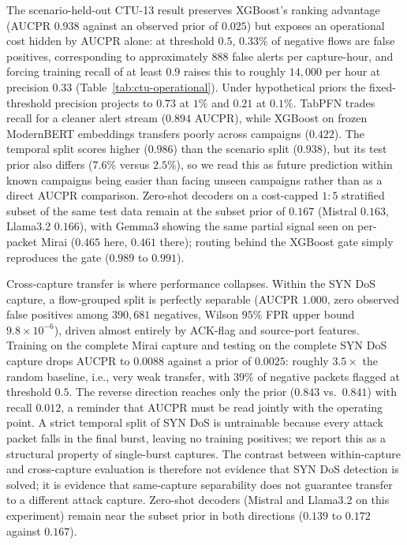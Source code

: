 \documentclass{jmlr}
\begin{document}


\noindent The scenario-held-out CTU-13 result preserves XGBoost's ranking advantage (AUCPR $0.938$ against an observed prior of $0.025$) but exposes an operational cost hidden by AUCPR alone: at threshold $0.5$, $0.33\%$ of negative flows are false positives, corresponding to approximately $888$ false alerts per capture-hour, and forcing training recall of at least $0.9$ raises this to roughly $14{,}000$ per hour at precision $0.33$ (Table~\ref{tab:ctu-operational}). Under hypothetical priors the fixed-threshold precision projects to $0.73$ at $1\%$ and $0.21$ at $0.1\%$. TabPFN trades recall for a cleaner alert stream ($0.894$ AUCPR), while XGBoost on frozen ModernBERT embeddings transfers poorly across campaigns ($0.422$). The temporal split scores higher ($0.986$) than the scenario split ($0.938$), but its test prior also differs ($7.6\%$ versus $2.5\%$), so we read this as future prediction within known campaigns being easier than facing unseen campaigns rather than as a direct AUCPR comparison. Zero-shot decoders on a cost-capped $1{:}5$ stratified subset of the same test data remain at the subset prior of $0.167$ (Mistral $0.163$, Llama3.2 $0.166$), with Gemma3 showing the same partial signal seen on per-packet Mirai ($0.465$ here, $0.461$ there); routing behind the XGBoost gate simply reproduces the gate ($0.989$ to $0.991$).

Cross-capture transfer is where performance collapses. Within the SYN DoS capture, a flow-grouped split is perfectly separable (AUCPR $1.000$, zero observed false positives among $390{,}681$ negatives, Wilson $95\%$ FPR upper bound $9.8\times 10^{-6}$), driven almost entirely by ACK-flag and source-port features. Training on the complete Mirai capture and testing on the complete SYN DoS capture drops AUCPR to $0.0088$ against a prior of $0.0025$: roughly $3.5\times$ the random baseline, i.e., very weak transfer, with $39\%$ of negative packets flagged at threshold $0.5$. The reverse direction reaches only the prior ($0.843$ vs.\ $0.841$) with recall $0.012$, a reminder that AUCPR must be read jointly with the operating point. A strict temporal split of SYN DoS is untrainable because every attack packet falls in the final burst, leaving no training positives; we report this as a structural property of single-burst captures. The contrast between within-capture and cross-capture evaluation is therefore not evidence that SYN DoS detection is solved; it is evidence that same-capture separability does not guarantee transfer to a different attack capture. Zero-shot decoders (Mistral and Llama3.2 on this experiment) remain near the subset prior in both directions ($0.139$ to $0.172$ against $0.167$).
\end{document}
